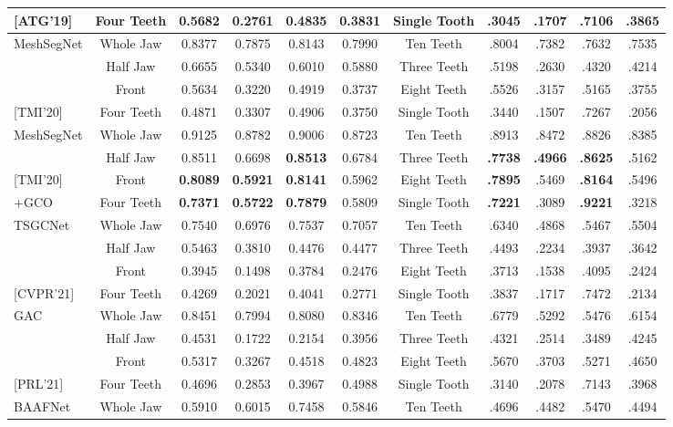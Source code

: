 \documentclass[letterpaper, 10 pt, conference]{ieeeconf}  %
\begin{document}
\begin{table*}[htbp]
\begin{tabular}{|l|c|c|c|c | c | c | c | c | c | c |}
{[ATG'19]} & Four Teeth & 0.5682 & 0.2761 & 0.4835 & 0.3831 & Single Tooth &  .3045 & .1707 & .7106 & .3865 \\
\hline
{MeshSegNet} & Whole Jaw & 0.8377 & 0.7875 & 0.8143 & 0.7990 & Ten Teeth & .8004 & .7382 & .7632 & .7535\\
& Half Jaw & 0.6655 & 0.5340 & 0.6010 & 0.5880 & Three Teeth  & .5198 & .2630 & .4320 & .4214\\
& Front & 0.5634 & 0.3220 & 0.4919 & 0.3737 & Eight Teeth & .5526 & .3157 & .5165 & .3755\\
{[TMI'20]}& Four Teeth & 0.4871 & 0.3307 & 0.4906 & 0.3750 & Single Tooth & .3440 & .1507 & .7267 & .2056 \\
\hline
{MeshSegNet } & Whole Jaw & 0.9125 & 0.8782 & 0.9006 & 0.8723  & Ten Teeth & .8913 & .8472 & .8826 & .8385 \\
& Half Jaw & 0.8511 & 0.6698 & \bf{0.8513} & 0.6784 & Three Teeth  & \bf{.7738} & \bf{.4966} & \bf{.8625} & .5162 \\
{[TMI'20]}& Front & \bf{0.8089} & \bf{0.5921} & \bf{0.8141} & 0.5962 & Eight Teeth & \bf{.7895} & .5469 & \bf{.8164} & .5496\\
{+GCO}& Four Teeth & \bf{0.7371} & \bf{0.5722} & \bf{0.7879} & 0.5809 & Single Tooth & \bf{.7221} & .3089 & \bf{.9221} & .3218 \\
\hline
{TSGCNet} & Whole Jaw & 0.7540 & 0.6976 & 0.7537 & 0.7057 & Ten Teeth & .6340 & .4868 & .5467 & .5504\\
& Half Jaw & 0.5463 & 0.3810 & 0.4476 & 0.4477 & Three Teeth  & .4493 & .2234 & .3937 & .3642 \\
& Front &  0.3945 & 0.1498 & 0.3784 & 0.2476 & Eight Teeth & .3713 & .1538 & .4095 & .2424\\
{[CVPR'21]} & Four Teeth &  0.4269 & 0.2021 & 0.4041 & 0.2771 & Single Tooth & .3837 &  .1717 & .7472 & .2134 \\
\hline
{GAC} &  Whole Jaw &  0.8451 & 0.7994 & 0.8080 & 0.8346  & Ten Teeth & .6779 & .5292 & .5476 & .6154\\
& Half Jaw & 0.4531 & 0.1722 & 0.2154 & 0.3956 & Three Teeth  & .4321 & .2514 & .3489 & .4245\\
& Front & 0.5317 & 0.3267 & 0.4518 & 0.4823 & Eight Teeth & .5670 & .3703 & .5271 & .4650\\
{[PRL'21]} & Four Teeth & 0.4696 & 0.2853 & 0.3967 & 0.4988 & Single Tooth  & .3140 & .2078 & .7143 & .3968 \\
\hline
{BAAFNet} & Whole Jaw & 0.5910 & 0.6015 & 0.7458 & 0.5846 & Ten Teeth & .4696 & .4482 & .5470 & .4494\\

\end{tabular}
\end{table*}
\end{document}
